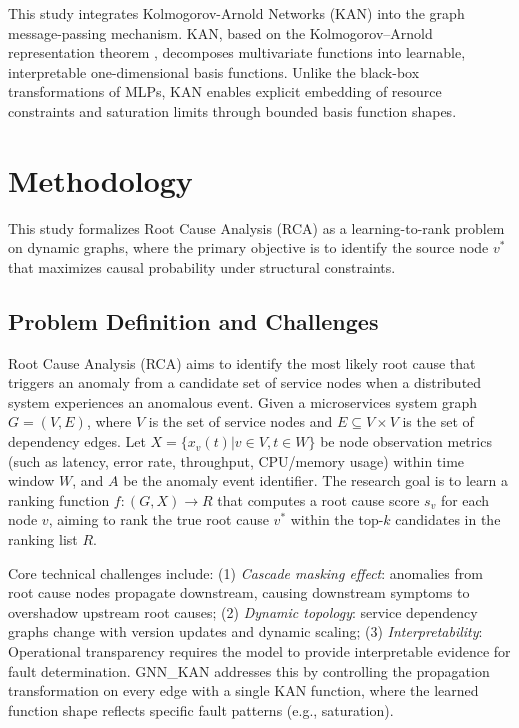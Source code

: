 \documentclass[conference]{IEEEtran}
\begin{document}
This study integrates Kolmogorov-Arnold Networks (KAN) \cite{kan2024} into the graph message-passing mechanism. KAN, based on the Kolmogorov--Arnold representation theorem \cite{kolmogorov1957,kan2024}, decomposes multivariate functions into learnable, interpretable one-dimensional basis functions. Unlike the black-box transformations of MLPs, KAN enables explicit embedding of resource constraints and saturation limits through bounded basis function shapes.

\section{Methodology}

This study formalizes Root Cause Analysis (RCA) as a learning-to-rank problem on dynamic graphs, where the primary objective is to identify the source node $v^*$ that maximizes causal probability under structural constraints.

\subsection{Problem Definition and Challenges}

Root Cause Analysis (RCA) aims to identify the most likely root cause that triggers an anomaly from a candidate set of service nodes when a distributed system experiences an anomalous event. Given a microservices system graph $G=(V, E)$, where $V$ is the set of service nodes and $E \subseteq V \times V$ is the set of dependency edges. Let $X = \{x_v(t) | v \in V, t \in W\}$ be node observation metrics (such as latency, error rate, throughput, CPU/memory usage) within time window $W$, and $A$ be the anomaly event identifier. The research goal is to learn a ranking function $f: (G, X) \to R$ that computes a root cause score $s_v$ for each node $v$, aiming to rank the true root cause $v^*$ within the top-$k$ candidates in the ranking list $R$.

Core technical challenges include: (1) \textit{Cascade masking effect}: anomalies from root cause nodes propagate downstream, causing downstream symptoms to overshadow upstream root causes; (2) \textit{Dynamic topology}: service dependency graphs change with version updates and dynamic scaling; (3) \textit{Interpretability}: Operational transparency requires the model to provide interpretable evidence for fault determination. GNN\_KAN addresses this by controlling the propagation transformation on every edge with a single KAN function, where the learned function shape reflects specific fault patterns (e.g., saturation).
\end{document}
